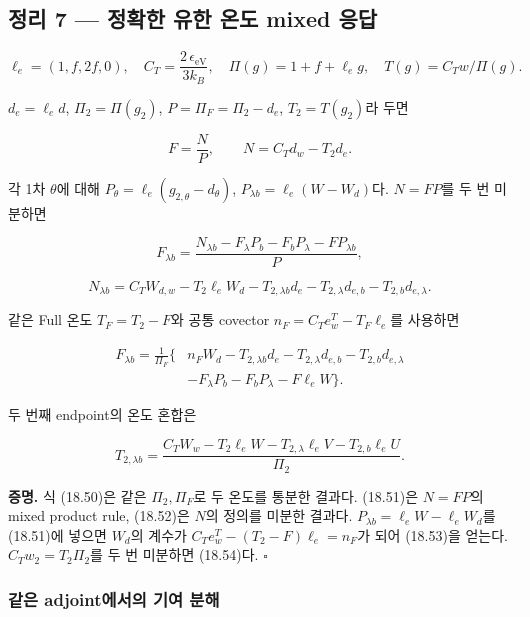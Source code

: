 \hypertarget{uxc815uxb9ac-7-uxc815uxd655uxd55c-uxc720uxd55c-uxc628uxb3c4-mixed-uxc751uxb2f5}{%
\subsection{정리 7 --- 정확한 유한 온도 mixed
응답}\label{uxc815uxb9ac-7-uxc815uxd655uxd55c-uxc720uxd55c-uxc628uxb3c4-mixed-uxc751uxb2f5}}

\[
\ell_e=(1,f,2f,0),\quad
C_T=\frac{2\,\epsilon_{\mathrm{eV}}}{3k_B},\quad
\Pi(g)=1+f+\ell_eg,\quad T(g)=C_Tw/\Pi(g).
\tag{18.49}
\]

\(d_e=\ell_ed\), \(\Pi_2=\Pi(g_2)\), \(P=\Pi_F=\Pi_2-d_e\),
\(T_2=T(g_2)\)라 두면

\[
F=\frac{N}{P},\qquad N=C_Td_w-T_2d_e.
\tag{18.50}
\]

각 1차 \(\theta\)에 대해 \(P_\theta=\ell_e(g_{2,\theta}-d_\theta)\),
\(P_{\lambda b}=\ell_e(W-W_d)\)다. \(N=FP\)를 두 번 미분하면

\[
\boxed{
F_{\lambda b}
=\frac{N_{\lambda b}-F_\lambda P_b-F_bP_\lambda-FP_{\lambda b}}{P},
}
\tag{18.51}
\]

\[
N_{\lambda b}
=C_TW_{d,w}-T_2\ell_eW_d
-T_{2,\lambda b}d_e
-T_{2,\lambda}d_{e,b}-T_{2,b}d_{e,\lambda}.
\tag{18.52}
\]

같은 Full 온도 \(T_F=T_2-F\)와 공통 covector
\(n_F=C_Te_w^T-T_F\ell_e\)를 사용하면

\[
\boxed{\begin{aligned}
F_{\lambda b}=\frac1{\Pi_F}\{&
n_FW_d-T_{2,\lambda b}d_e
-T_{2,\lambda}d_{e,b}-T_{2,b}d_{e,\lambda}\\
&-F_\lambda P_b-F_bP_\lambda-F\ell_eW\}.
\end{aligned}}
\tag{18.53}
\]

두 번째 endpoint의 온도 혼합은

\[
\boxed{
T_{2,\lambda b}
=\frac{C_TW_w-T_2\ell_eW
-T_{2,\lambda}\ell_eV-T_{2,b}\ell_eU}{\Pi_2}.
}
\tag{18.54}
\]

\textbf{증명.} 식 (18.50)은 같은 \(\Pi_2,\Pi_F\)로 두 온도를 통분한
결과다. (18.51)은 \(N=FP\)의 mixed product rule, (18.52)은 \(N\)의
정의를 미분한 결과다. \(P_{\lambda b}=\ell_eW-\ell_eW_d\)를 (18.51)에
넣으면 \(W_d\)의 계수가 \(C_Te_w^T-(T_2-F)\ell_e=n_F\)가 되어 (18.53)을
얻는다. \(C_Tw_2=T_2\Pi_2\)를 두 번 미분하면 (18.54)다. \(\square\)

\hypertarget{uxac19uxc740-adjointuxc5d0uxc11cuxc758-uxae30uxc5ec-uxbd84uxd574}{%
\subsubsection{같은 adjoint에서의 기여
분해}\label{uxac19uxc740-adjointuxc5d0uxc11cuxc758-uxae30uxc5ec-uxbd84uxd574}}

